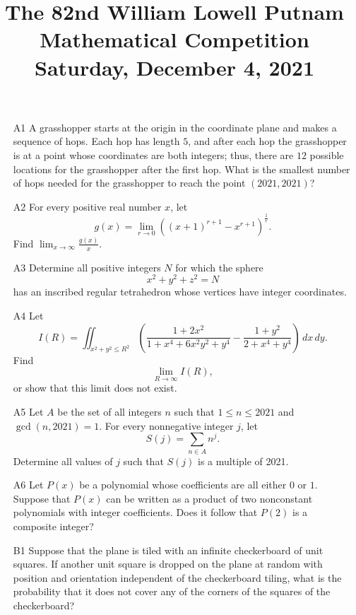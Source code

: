 \documentclass[amssymb,twocolumn,pra,10pt,aps,nofootinbib]{revtex4-1}
\begin{document}
\title{The 82nd William Lowell Putnam Mathematical Competition \\
    Saturday, December 4, 2021}
\maketitle

\begin{itemize}

\item[A1]
A grasshopper starts at the origin in the coordinate plane and makes a sequence of hops.
Each hop has length $5$, and after each hop the grasshopper is at a point whose coordinates are both integers; thus, there are $12$ possible locations for the grasshopper after the first hop.
What is the smallest number of hops needed for the grasshopper to reach the point $(2021, 2021)$?

\item[A2]
For every positive real number $x$, let
\[
g(x) = \lim_{r \to 0} ((x+1)^{r+1} - x^{r+1})^{\frac{1}{r}}.
\]
Find $\lim_{x \to \infty} \frac{g(x)}{x}$.

\item[A3]
Determine all positive integers $N$ for which the sphere
\[
x^2 + y^2 + z^2 = N
\]
has an inscribed regular tetrahedron whose vertices have integer coordinates.

\item[A4]
Let
\[
I(R) = \iint_{x^2+y^2 \leq R^2} \left( \frac{1+2x^2}{1+x^4+6x^2y^2+y^4} - \frac{1+y^2}{2+x^4+y^4} \right)\,dx\,dy.
\]
Find
\[
\lim_{R \to \infty} I(R),
\]
or show that this limit does not exist.
 
\item[A5]
Let $A$ be the set of all integers $n$ such that $1 \leq n \leq 2021$ and $\gcd(n, 2021) = 1$.
For every nonnegative integer $j$, let
\[
S(j) = \sum_{n \in A} n^j.
\]
Determine all values of $j$ such that $S(j)$ is a multiple of 2021.

\item[A6] 
Let $P(x)$ be a polynomial whose coefficients are all either $0$ or $1$.
Suppose that $P(x)$ can be written as a product of two nonconstant polynomials with integer coefficients. Does it follow that $P(2)$ is a composite integer?

\item[B1]
Suppose that the plane is tiled with an infinite checkerboard of unit squares. If another unit square is dropped on the plane at random with position and orientation independent of the checkerboard tiling, what is the probability that it does not cover any of the corners of the squares of the checkerboard?


\end{itemize}
\end{document}

